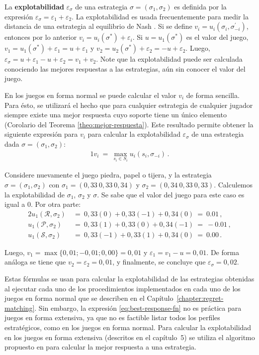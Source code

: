 La \textbf{explotabilidad} $\varepsilon_\sigma$ de una estrategia $\sigma = (\sigma_1, \sigma_2)$ es definida por la expresión $\varepsilon_{\sigma} = \varepsilon_1 + \varepsilon_2$. La explotabilidad es usada frecuentemente para medir la distancia de una estrategia al equilibrio de Nash \cite[p. 7]{bib:thesis-marc-lanctot}. Si se define $v_i = u_i(\sigma_i, \sigma^{\prime}_{-i})$, entonces por lo anterior $v_i = u_i(\sigma^*) + \varepsilon_i$. Si $u=u_1(\sigma^*)$ es el valor del juego,  $v_1 = u_1(\sigma^*) + \varepsilon_1 = u + \varepsilon_1$ y $v_2 = u_2(\sigma^*) + \varepsilon_2 = -u + \varepsilon_2$. Luego, $\varepsilon_{\sigma} = u + \varepsilon_1 - u + \varepsilon_2 =  v_1 + v_2$. Note que la explotabilidad puede ser calculada conociendo las mejores respuestas a las estrategias, aún sin conocer el valor del juego.

En los juegos en forma normal se puede calcular el valor $v_i$ de forma sencilla. Para ésto, se utilizará el hecho que para cualquier estrategia de cualquier jugador siempre existe una mejor respuesta cuyo soporte tiene un único elemento (Corolario del Teorema \ref{theo:mejor-respuesta}). Este resultado permite obtener la siguiente expresión para $v_i$ para calcular la explotabilidad $\varepsilon_\sigma$ de una estrategia dada $\sigma=(\sigma_1,\sigma_2)$:
\begin{alignat}{1}
\label{eq:best-response-fn}
v_i\ =\ \max_{s_{i} \in S_{i}} u_i(s_i, \sigma_{-i}) \,.
\end{alignat}

Considere nuevamente el juego piedra, papel o tijera, y la estrategia $\sigma = (\sigma_1, \sigma_2)$ con $\sigma_1 = (0,33\ 0,33\ 0,34)$ y $\sigma_2 = (0,34\ 0,33\ 0,33)$. Calculemos la explotabilidad de $\sigma_1$, $\sigma_2$ y $\sigma$. Se sabe que el valor del juego para este caso es igual a $0$. Por otra parte:
\begin{alignat}{2}
u_1(\mathcal{R}, \sigma_2)\ &=\ 0,33(0)  +  0,33(-1) +  0,34(0)\  =\  0.01 \,, \\
u_1(\mathcal{P}, \sigma_2)\ &=\ 0,33(1)  +   0,33(0) +  0,34(-1)\ =\ -0.01 \,, \\
u_1(\mathcal{S}, \sigma_2)\ &=\ 0,33(-1) +   0,33(1) +  0,34(0)\  =\  0.00 \,.
\end{alignat}

Luego, $v_1 = \max\{0,01; -0,01; 0,00\} = 0,01$ y $\varepsilon_1 = v_1 - u = 0,01$. De forma análoga se tiene que $v_2 = \varepsilon_2 = 0,01$, y finalmente, se concluye que $\varepsilon_{\sigma} = 0,02$.

Estas fórmulas se usan para calcular la explotabilidad de las estrategias obtenidas al ejecutar cada uno de los procedimientos implementados en cada uno de los juegos en forma normal que se describen en el Capítulo~\ref{chapter:regret-matching}. Sin embargo, la expresión \ref{eq:best-response-fn} no es práctica para juegos en forma extensiva, ya que no es factible listar todos los perfiles estratégicos, como en los juegos en forma normal. Para calcular la explotabilidad en los juegos en forma extensiva (descritos en el capítulo~5) se utiliza el algoritmo propuesto en \cite{bib:thesis-marc-lanctot} para calcular la mejor respuesta a una estrategia. 
